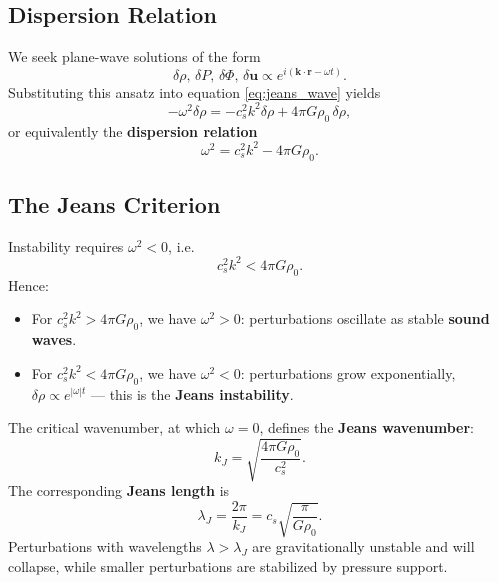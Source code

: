\subsection*{Dispersion Relation}

We seek plane-wave solutions of the form
\begin{equation}
\delta\rho,\,\delta P,\,\delta\Phi,\,\delta\mathbf{u} 
\propto e^{i(\mathbf{k}\cdot\mathbf{r} - \omega t)}.
\end{equation}
Substituting this ansatz into equation \eqref{eq:jeans_wave} yields
\begin{equation}
-\omega^2 \delta\rho = -c_s^2 k^2 \delta\rho + 4\pi G\rho_0\,\delta\rho,
\end{equation}
or equivalently the \textbf{dispersion relation}
\begin{equation}
\boxed{\omega^2 = c_s^2 k^2 - 4\pi G \rho_0.}
\label{eq:jeans_dispersion}
\end{equation}

\subsection*{The Jeans Criterion}

Instability requires $\omega^2 < 0$, i.e.
\begin{equation}
c_s^2 k^2 < 4\pi G \rho_0.
\end{equation}
Hence:
\begin{itemize}
    \item For $c_s^2 k^2 > 4\pi G \rho_0$, we have $\omega^2 > 0$: perturbations oscillate as stable \textbf{sound waves}.
    \item For $c_s^2 k^2 < 4\pi G \rho_0$, we have $\omega^2 < 0$: perturbations grow exponentially, $\delta\rho \propto e^{|\omega| t}$ — this is the \textbf{Jeans instability}.
\end{itemize}

The critical wavenumber, at which $\omega=0$, defines the \textbf{Jeans wavenumber}:
\begin{equation}
k_J = \sqrt{\frac{4\pi G \rho_0}{c_s^2}}.
\end{equation}
The corresponding \textbf{Jeans length} is
\begin{equation}
\lambda_J = \frac{2\pi}{k_J} = c_s \sqrt{\frac{\pi}{G \rho_0}}.
\end{equation}
Perturbations with wavelengths $\lambda > \lambda_J$ are gravitationally unstable and will collapse, while smaller perturbations are stabilized by pressure support.

